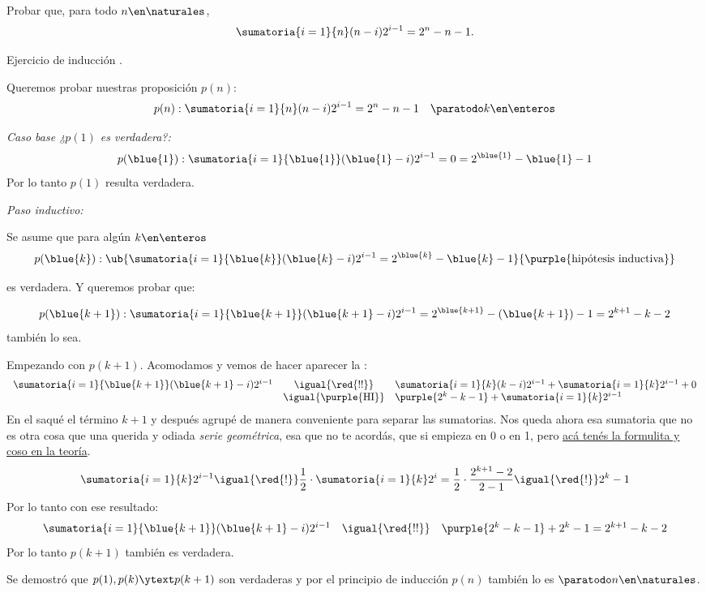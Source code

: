 \begin{enunciado}{\ejExtra}
  Probar que, para todo $n \en \naturales$,
  $$
    \sumatoria{i=1}{n}(n-i)2^{i-1} = 2^n -n -1.
  $$
\end{enunciado}
Ejercicio de inducción .

Queremos probar nuestras proposición $p(n)$:
$$
  p(n) : \sumatoria{i=1}{n}(n-i)2^{i-1} = 2^n - n -1 \quad \paratodo k \en \enteros
$$

\textit{Caso base  ¿$p(1)$ es verdadera?:}
$$
  p(\blue{1}) : \sumatoria{i=1}{\blue{1}}(\blue{1} - i)2^{i-1} = 0 =  2^{\blue{1}} - \blue{1} -1
$$
Por lo tanto $p(1)$ resulta verdadera.

\textit{Paso inductivo:}

Se asume que para algún $k\en \enteros$
$$
  p(\blue{k}) : \ub{
  \sumatoria{i=1}{\blue{k}}(\blue{k} - i)2^{i-1} =  2^{\blue{k}} - \blue{k} - 1
  }{\purple{\text{hipótesis inductiva}}}
$$

es verdadera. Y queremos probar que:

$$
  p(\blue{k+1}) : \sumatoria{i=1}{\blue{k+1}}(\blue{k+1}-i)2^{i-1} =  2^{\blue{k+1}} - (\blue{k+1}) - 1 = 2^{k+1} - k - 2
$$
también lo sea.

Empezando con $p(k+1)$. Acomodamos y vemos de hacer aparecer la :
$$
  \begin{array}{rcl}
    \sumatoria{i=1}{\blue{k+1}}(\blue{k+1}-i)2^{i-1} & \igual{\red{!!}}           & \sumatoria{i=1}{k}(k-i)2^{i-1} + \sumatoria{i=1}{k} 2^{i-1} + 0 \\
                                                     & \igual{\purple{\text{HI}}} & \purple{2^k - k - 1} +  \sumatoria{i=1}{k} 2^{i-1}
  \end{array}
$$
En el \red{!!} saqué el término $k+1$ y después agrupé de manera conveniente para separar las sumatorias. Nos queda ahora esa sumatoria que no es
otra cosa que una querida y odiada \textit{serie geométrica}, esa que no te acordás, que si empieza en 0 o en 1,
pero \hyperlink{2-teoria:geometrica}{acá tenés la formulita y coso en la teoría}.
$$
  \sumatoria{i=1}{k} 2^{i-1} \igual{\red{!}}
  \frac{1}{2} \cdot \sumatoria{i=1}{k} 2^i =
  \frac{1}{2} \cdot \frac{2^{k+1} - 2}{2 - 1}
  \igual{\red{!}}
  2^k - 1
$$
Por lo tanto con ese resultado:
$$
  \begin{array}{rcl}
    \sumatoria{i=1}{\blue{k+1}}(\blue{k+1}-i)2^{i-1} & \igual{\red{!!}} & \purple{2^k - k - 1} + 2^k - 1 =  2^{k+1} - k - 2
  \end{array}
$$
Por lo tanto $p(k+1)$ también es verdadera.

\bigskip

Se demostró que $p(1), p(k) \ytext p(k+1)$ son verdaderas y por el principio de inducción $p(n)$ también lo es $\paratodo n \en \naturales$.

\begin{aportes}
  \item {}
  \item {}
\end{aportes}
